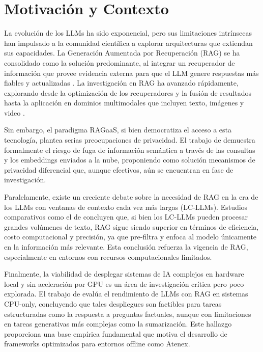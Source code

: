 \section{Motivación y Contexto}

La evolución de los LLMs ha sido exponencial, pero sus limitaciones intrínsecas han impulsado a la comunidad científica a explorar arquitecturas que extiendan sus capacidades. La Generación Aumentada por Recuperación (RAG) se ha consolidado como la solución predominante, al integrar un recuperador de información que provee evidencia externa para que el LLM genere respuestas más fiables y actualizadas \cite{Yu2024RAGEvalSurvey}. La investigación en RAG ha avanzado rápidamente, explorando desde la optimización de los recuperadores y la fusión de resultados hasta la aplicación en dominios multimodales que incluyen texto, imágenes y video \cite{Drushchak2025mRAG, Zheng2025RAGinVision}.

Sin embargo, el paradigma RAGaaS, si bien democratiza el acceso a esta tecnología, plantea serias preocupaciones de privacidad. El trabajo de \cite{Cheng2025RemoteRAG} demuestra formalmente el riesgo de fuga de información semántica a través de las consultas y los embeddings enviados a la nube, proponiendo como solución mecanismos de privacidad diferencial que, aunque efectivos, aún se encuentran en fase de investigación.

Paralelamente, existe un creciente debate sobre la necesidad de RAG en la era de los LLMs con ventanas de contexto cada vez más largas (LC-LLMs). Estudios comparativos como el de \cite{Li2024LCvsRAG} concluyen que, si bien los LC-LLMs pueden procesar grandes volúmenes de texto, RAG sigue siendo superior en términos de eficiencia, costo computacional y precisión, ya que pre-filtra y enfoca al modelo únicamente en la información más relevante. Esta conclusión refuerza la vigencia de RAG, especialmente en entornos con recursos computacionales limitados.

Finalmente, la viabilidad de desplegar sistemas de IA complejos en hardware local y sin aceleración por GPU es un área de investigación crítica pero poco explorada. El trabajo de \cite{Tyndall2025OfflineRAG} evalúa el rendimiento de LLMs con RAG en sistemas CPU-only, concluyendo que tales despliegues son factibles para tareas estructuradas como la respuesta a preguntas factuales, aunque con limitaciones en tareas generativas más complejas como la sumarización. Este hallazgo proporciona una base empírica fundamental que motiva el desarrollo de frameworks optimizados para entornos offline como Atenex.

